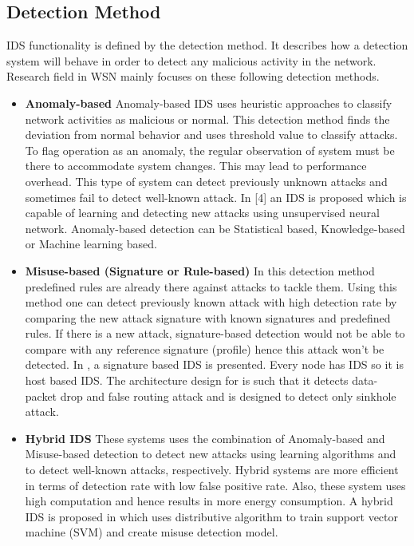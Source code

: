 \subsection{Detection Method}
IDS functionality is defined by the detection method. It describes how a detection system will behave in order to detect any malicious activity in the network. Research field in WSN mainly focuses on these following detection methods.
\begin{itemize}
  \item{\textbf{Anomaly-based} Anomaly-based IDS uses heuristic approaches to classify network activities as malicious or normal. This detection method finds the deviation from normal behavior and uses threshold value to classify attacks. To flag operation as an anomaly, the regular observation of system must be there to accommodate system changes. This may lead to performance overhead. This type of system can detect previously unknown attacks and sometimes fail to detect well-known attack. In [4] an IDS is proposed which is capable of learning and detecting new attacks using unsupervised neural network. Anomaly-based detection can be Statistical based, Knowledge-based or Machine learning based.}
  \item{\textbf{Misuse-based (Signature or Rule-based)} In this detection method predefined rules are already there against attacks to tackle them. Using this method one can detect previously known attack with high detection rate by comparing the new attack signature with known signatures and predefined rules. If there is a new attack, signature-based detection would not be able to compare with any reference signature (profile) hence this attack won’t be detected. In \cite{ioannis2007towards, krontiris2007intrusion}, a signature based IDS is presented. Every node has IDS so it is host based IDS. The architecture design for \cite{ioannis2007towards} is such that it detects data-packet drop and false routing attack and \cite{krontiris2007intrusion} is designed to detect only sinkhole attack.}
  \item{\textbf{Hybrid IDS} These systems uses the combination of Anomaly-based and Misuse-based detection to detect new attacks using learning algorithms and  to detect well-known attacks, respectively. Hybrid systems are more efficient in terms of detection rate with low false positive rate. Also, these system uses high computation and hence results in more energy consumption. A hybrid IDS is proposed in \cite{li2008intruder} which uses distributive algorithm to train support vector machine (SVM) and create misuse detection model.}
\end{itemize}

